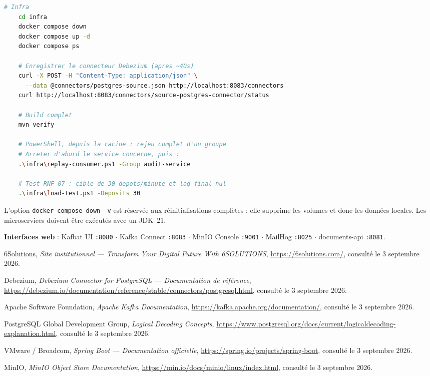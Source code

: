 \documentclass[12pt,a4paper,openany]{report}
\begin{document}
    \begin{lstlisting}[language=bash]
    # Infra
    cd infra
    docker compose down
    docker compose up -d
    docker compose ps

    # Enregistrer le connecteur Debezium (apres ~40s)
    curl -X POST -H "Content-Type: application/json" \
      --data @connectors/postgres-source.json http://localhost:8083/connectors
    curl http://localhost:8083/connectors/source-postgres-connector/status

    # Build complet
    mvn verify

    # PowerShell, depuis la racine : rejeu complet d'un groupe
    # Arreter d'abord le service concerne, puis :
    .\infra\replay-consumer.ps1 -Group audit-service

    # Test RNF-07 : cible de 30 depots/minute et lag final nul
    .\infra\load-test.ps1 -Deposits 30
    \end{lstlisting}

    L'option \texttt{docker compose down -v} est r\'eserv\'ee aux r\'einitialisations compl\`etes : elle supprime les volumes et donc les donn\'ees locales. Les microservices doivent \^etre ex\'ecut\'es avec un JDK~21.

    \textbf{Interfaces web} : Kafbat UI \texttt{:8080} $\cdot$ Kafka Connect \texttt{:8083} $\cdot$ MinIO Console \texttt{:9001} $\cdot$ MailHog \texttt{:8025} $\cdot$ documents-api \texttt{:8081}.

    \cleardoublepage
    \renewcommand{\bibname}{Bibliographie et Webographie}
    \begin{thebibliography}{9}

    6Solutions, \emph{Site institutionnel --- Transform Your Digital Future With 6SOLUTIONS},
    \url{https://6solutions.com/}, consult\'e le 3 septembre 2026.

    Debezium, \emph{Debezium Connector for PostgreSQL --- Documentation de r\'ef\'erence},
    \url{https://debezium.io/documentation/reference/stable/connectors/postgresql.html}, consult\'e le 3 septembre 2026.

    Apache Software Foundation, \emph{Apache Kafka Documentation},
    \url{https://kafka.apache.org/documentation/}, consult\'e le 3 septembre 2026.

    PostgreSQL Global Development Group, \emph{Logical Decoding Concepts},
    \url{https://www.postgresql.org/docs/current/logicaldecoding-explanation.html}, consult\'e le 3 septembre 2026.

    VMware / Broadcom, \emph{Spring Boot --- Documentation officielle},
    \url{https://spring.io/projects/spring-boot}, consult\'e le 3 septembre 2026.

    MinIO, \emph{MinIO Object Store Documentation},
    \url{https://min.io/docs/minio/linux/index.html}, consult\'e le 3 septembre 2026.

    \end{thebibliography}

    
\end{document}
